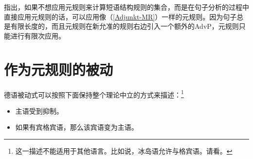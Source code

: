 \citet{WP92b}指出，如果不想应用元规则来计算短语结构规则的集合，而是在句子分析的过程中直接应用元规则的话，可以应用像（\ref{Adjunkt-MR}）一样的元规则。因为句子总是有限长度的，而且元规则在新允准的规则右边引入一个额外的AdvP，元规则只能进行有限次应用。

\section{作为元规则的被动}
\label{sec-passive-gpsg}

德语被动式可以按照下面保持整个理论中立的方式来描述：\footnote{%
这一描述不能适用于其他语言。比如说，冰岛语允许与格宾语。请看\citet*{ZMT85a}。
}
\begin{itemize}
\item 主语受到抑制。
\item 如果有宾格宾语，那么该宾语变为主语。
\end{itemize}


